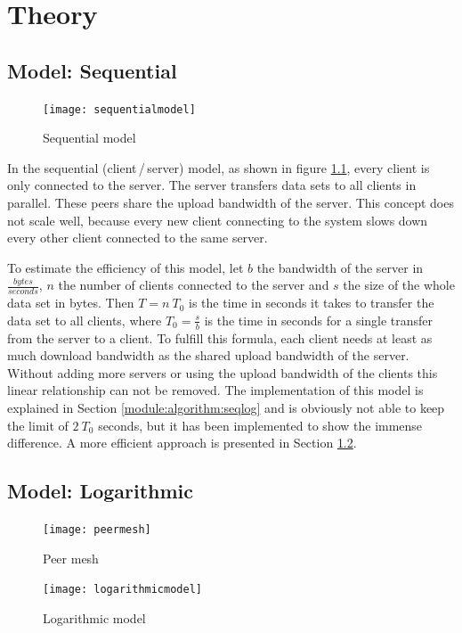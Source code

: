 \chapter{Theory}
\label{theory}

\section{Model: Sequential}
\label{theory:model:sequential}

\begin{figure}[ht]
	\centering
	\texttt{[image: sequentialmodel]}
	\caption{Sequential model}
	\label{fig:sequentialmodel}
\end{figure}

In the sequential (client\,/\,server) model, as shown in figure \ref{fig:sequentialmodel}, every client is only connected to the server. The server transfers data sets to all clients in parallel. These peers share the upload bandwidth of the server. This concept does not scale well, because every new client connecting to the system slows down every other client connected to the same server. 

To estimate the efficiency of this model, let $b$ the bandwidth of the server in $\frac{bytes}{seconds}$, $n$ the number of clients connected to the server and $s$ the size of the whole data set in bytes. Then $T= n\:T_0$ is the time in seconds it takes to transfer the data set to all clients, where $T_0=\frac{s}{b}$ is the time in seconds for a single transfer from the server to a client. To fulfill this formula, each client needs at least as much download bandwidth as the shared upload bandwidth of the server. Without adding more servers or using the upload bandwidth of the clients this linear relationship can not be removed. The implementation of this model is explained in Section \ref{module:algorithm:seqlog} and is obviously not able to keep the limit of $2\:T_0$ seconds, but it has been implemented to show the immense difference. A more efficient approach is presented in Section \ref{theory:model:logarithmic}.

\pagebreak
\section{Model: Logarithmic}
\label{theory:model:logarithmic}

\begin{figure} [ht]
	\centering
	\begin{minipage}[b]{0.4\linewidth}
		\texttt{[image: peermesh]}
		\caption{Peer mesh}
		\label{fig:peermesh}
	\end{minipage}
	\hspace{0.1\linewidth}
	\begin{minipage}[b]{0.4\linewidth}
		\texttt{[image: logarithmicmodel]}
		\caption{Logarithmic model}
		\label{fig:logarithmicmodel}
	\end{minipage}

\end{figure}


